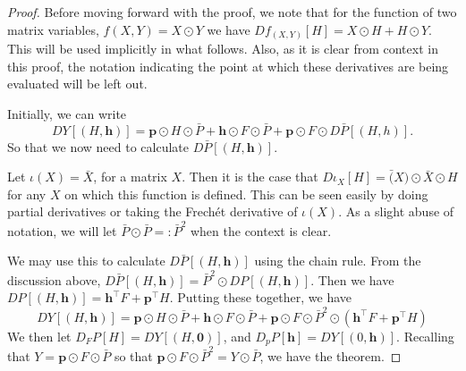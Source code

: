 \begin{proof}
Before moving forward with the proof, we note that for the function of two matrix variables, $f(X,Y)=X\odot Y$ we have $Df_{(X,Y)}[H]=X\odot H+H\odot Y$.  This will be used implicitly in what follows.  Also, as it is clear from context in this proof, the notation indicating the point at which these derivatives are being evaluated will be left out.

Initially, we can write
\[DY[(H,\bm h)]=\bm p\odot H\odot \bar{P}+\bm h\odot F\odot \bar{P}+\bm p\odot F\odot D\bar{P}[(H,h)].\]
So that we now need to calculate $D\bar{P}[(H,\bm h)]$.

Let $\iota(X)=\bar{X}$, for a matrix $X$. Then it is the case that $D\iota_X[H]=\bar(X)\odot \bar{X}\odot H$ for any $X$ on which this function is defined.  This can be seen easily by doing partial derivatives or taking the Frech\'et derivative of $\iota(X)$.  As a slight abuse of notation, we will let  $\bar{P}\odot \bar{P}=:\bar{P}^2$ when the context is clear.

We may use this to calculate $D\bar{P}[(H,\bm h)]$ using the chain rule.  From the discussion above, $D\bar{P}[(H,\bm h)]=\bar{P}^2\odot DP[(H,\bm h)]$. Then we have $DP[(H,\bm h)]=\bm h^{\intercal}F+\bm p^{\intercal}H$. Putting these together, we have 
\begin{equation}
DY[(H,\bm h)]=\bm p\odot H\odot \bar{P}+\bm h\odot F\odot \bar{P}+\bm p\odot F\odot\bar{P}^2\odot(\bm h^{\intercal}F+\bm p^{\intercal}H)
\end{equation}
We then let $D_FP[H]=DY[(H,\bm 0)]$, and $D_pP[\bm h]=DY[(0,\bm h)]$. Recalling that $Y=\bm p\odot F\odot\bar{P}$ so that $\bm p\odot F\odot\bar{P}^2=Y\odot \bar{P}$, we have the theorem.
\end{proof}

